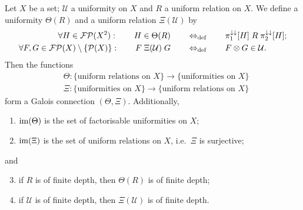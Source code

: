 \begin{proposition} \label{uniformRelationGaloisConnection}
Let $X$ be a set; $\mathcal{U}$ a uniformity on $X$ and $R$ a uniform relation on $X$. We define a uniformity $\Theta(R)$ and a uniform relation $\Xi(\mathcal{U})$ by
\begin{align*}
\forall H\in \operatorname{\mathcal{FP}}(X^2):\qquad H\in\Theta(R) \quad&\quad\Leftrightarrow_{\text{def}}\quad\quad \pi_1^{\downarrow\downarrow}[H]\mathrel{R}\pi_2^{\downarrow\downarrow}[H]; \\
\forall F,G\in\operatorname{\mathcal{FP}}(X)\setminus\{\operatorname{\mathcal{P}}(X)\}:\qquad F\mathrel{\Xi(\mathcal{U})}G \quad&\quad\Leftrightarrow_{\text{def}}\quad\quad F\otimes G\in \mathcal{U}. 
\end{align*}
Then the functions
\begin{align*}
&\Theta: \{\text{uniform relations on $X$}\} \to \{\text{uniformities on $X$}\} \\
&\Xi: \{\text{uniformities on $X$}\} \to \{\text{uniform relations on $X$}\}
\end{align*}
form a Galois connection $(\Theta, \Xi)$. Additionally,
\begin{enumerate}
\item $\operatorname{im}(\Theta)$ is the set of factorisable uniformities on $X$;
\item $\operatorname{im}(\Xi)$ is the set of uniform relations on $X$, i.e.\ $\Xi$ is surjective;
\end{enumerate}
and
\begin{enumerate} \setcounter{enumi}{2}
\item if $R$ is of finite depth, then $\Theta(R)$ is of finite depth;
\item if $\mathcal{U}$ is of finite depth, then $\Xi(\mathcal{U})$ is of finite depth.
\end{enumerate}
\end{proposition}
